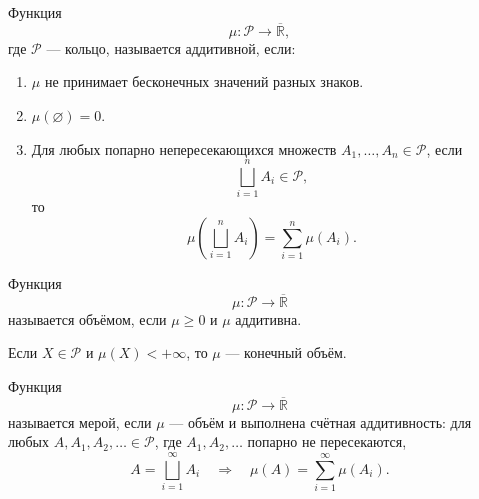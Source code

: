 \label{definition:10}

\begin{definition}
Функция
\[
    \mu:\mathcal{P}\to\overline{\mathbb{R}},
\]
где \(\mathcal{P}\) --- кольцо, называется аддитивной, если:
\begin{enumerate}
    \item \(\mu\) не принимает бесконечных значений разных знаков.

    \item \(\mu(\varnothing)=0\).

    \item Для любых попарно непересекающихся множеств
    \(A_1,\ldots,A_n\in\mathcal{P}\), если
    \[
        \bigsqcup_{i=1}^{n}A_i\in\mathcal{P},
    \]
    то
    \[
        \mu\left(\bigsqcup_{i=1}^{n}A_i\right)
        =\sum_{i=1}^{n}\mu(A_i).
    \]
\end{enumerate}
\end{definition}

\begin{definition}
Функция
\[
    \mu:\mathcal{P}\to\overline{\mathbb{R}}
\]
называется объёмом, если \(\mu\ge 0\) и \(\mu\) аддитивна.
\end{definition}

Если \(X\in\mathcal{P}\) и \(\mu(X)<+\infty\), то
\(\mu\) --- конечный объём.

\begin{definition}
Функция
\[
    \mu:\mathcal{P}\to\overline{\mathbb{R}}
\]
называется мерой, если \(\mu\) --- объём и выполнена
счётная аддитивность:
для любых \(A,A_1,A_2,\ldots\in\mathcal{P}\),
где \(A_1,A_2,\ldots\) попарно не пересекаются,
\[
    A=\bigsqcup_{i=1}^{\infty}A_i
    \quad\Longrightarrow\quad
    \mu(A)=\sum_{i=1}^{\infty}\mu(A_i).
\]
\end{definition}
